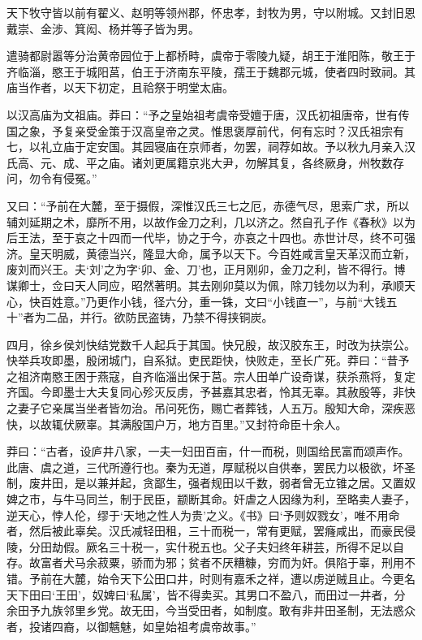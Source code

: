 \documentclass[12pt,UTF8]{ctexbook}
\begin{document}
天下牧守皆以前有翟义、赵明等领州郡，怀忠孝，封牧为男，守以附城。又封旧恩戴崇、金涉、箕闳、杨并等子皆为男。



遣骑都尉嚣等分治黄帝园位于上都桥畤，虞帝于零陵九疑，胡王于淮阳陈，敬王于齐临淄，愍王于城阳莒，伯王于济南东平陵，孺王于魏郡元城，使者四时致祠。其庙当作者，以天下初定，且祫祭于明堂太庙。



以汉高庙为文祖庙。莽曰：“予之皇始祖考虞帝受嬗于唐，汉氏初祖唐帝，世有传国之象，予复亲受金策于汉高皇帝之灵。惟思褒厚前代，何有忘时？汉氏祖宗有七，以礼立庙于定安国。其园寝庙在京师者，勿罢，祠荐如故。予以秋九月亲入汉氏高、元、成、平之庙。诸刘更属籍京兆大尹，勿解其复，各终厥身，州牧数存问，勿令有侵冤。”



又曰：“予前在大麓，至于摄假，深惟汉氏三七之厄，赤德气尽，思索广求，所以辅刘延期之术，靡所不用，以故作金刀之利，几以济之。然自孔子作《春秋》以为后王法，至于哀之十四而一代毕，协之于今，亦哀之十四也。赤世计尽，终不可强济。皇天明威，黄德当兴，隆显大命，属予以天下。今百姓咸言皇天革汉而立新，废刘而兴王。夫‘刘’之为字‘卯、金、刀’也，正月刚卯，金刀之利，皆不得行。博谋卿士，佥曰天人同应，昭然著明。其去刚卯莫以为佩，除刀钱勿以为利，承顺天心，快百姓意。”乃更作小钱，径六分，重一铢，文曰“小钱直一”，与前“大钱五十”者为二品，并行。欲防民盗铸，乃禁不得挟铜炭。



四月，徐乡侯刘快结党数千人起兵于其国。快兄殷，故汉胶东王，时改为扶崇公。快举兵攻即墨，殷闭城门，自系狱。吏民距快，快败走，至长广死。莽曰：“昔予之祖济南愍王困于燕寇，自齐临淄出保于莒。宗人田单广设奇谋，获杀燕将，复定齐国。今即墨士大夫复同心殄灭反虏，予甚嘉其忠者，怜其无辜。其赦殷等，非快之妻子它亲属当坐者皆勿治。吊问死伤，赐亡者葬钱，人五万。殷知大命，深疾恶快，以故辄伏厥辜。其满殷国户万，地方百里。”又封符命臣十余人。



莽曰：“古者，设庐井八家，一夫一妇田百亩，什一而税，则国给民富而颂声作。此唐、虞之道，三代所遵行也。秦为无道，厚赋税以自供奉，罢民力以极欲，坏圣制，废井田，是以兼并起，贪鄙生，强者规田以千数，弱者曾无立锥之居。又置奴婢之市，与牛马同兰，制于民臣，颛断其命。奸虐之人因缘为利，至略卖人妻子，逆天心，悖人伦，缪于‘天地之性人为贵’之义。《书》曰‘予则奴戮女’，唯不用命者，然后被此辜矣。汉氏减轻田租，三十而税一，常有更赋，罢癃咸出，而豪民侵陵，分田劫假。厥名三十税一，实什税五也。父子夫妇终年耕芸，所得不足以自存。故富者犬马余菽粟，骄而为邪；贫者不厌糟糠，穷而为奸。俱陷于辜，刑用不错。予前在大麓，始令天下公田口井，时则有嘉禾之祥，遭以虏逆贼且止。今更名天下田曰‘王田’，奴婢曰‘私属’，皆不得卖买。其男口不盈八，而田过一井者，分余田予九族邻里乡党。故无田，今当受田者，如制度。敢有非井田圣制，无法惑众者，投诸四裔，以御魑魅，如皇始祖考虞帝故事。”
\end{document}
